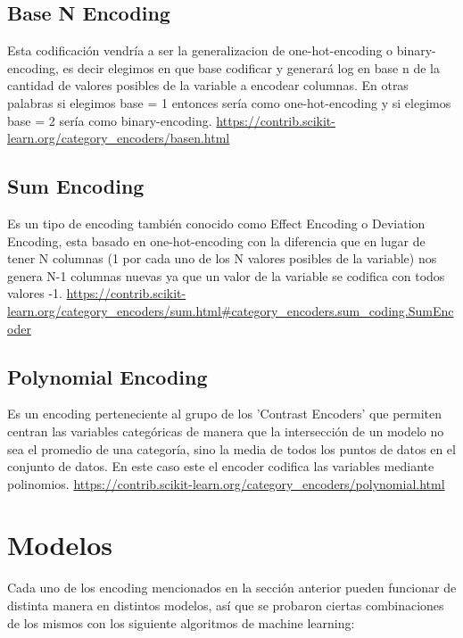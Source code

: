 \documentclass[12pt,a4paper]{article}
\begin{document}
\subsection{Base N Encoding}
Esta codificación vendría a ser la generalizacion de one-hot-encoding o binary-encoding, es decir elegimos en que base codificar y generará log en base n de la cantidad de valores posibles de la variable a encodear columnas. En otras palabras si elegimos base = 1 entonces sería como one-hot-encoding y si elegimos base = 2 sería como binary-encoding.
\url{https://contrib.scikit-learn.org/category_encoders/basen.html}

\subsection{Sum Encoding}
Es un tipo de encoding también conocido como Effect Encoding o Deviation Encoding, esta basado en one-hot-encoding con la diferencia que en lugar de tener N columnas (1 por cada uno de los N valores posibles de la variable) nos genera N-1 columnas nuevas ya que un valor de la variable se codifica con todos valores -1.
\url{https://contrib.scikit-learn.org/category_encoders/sum.html#category_encoders.sum_coding.SumEncoder}

\subsection{Polynomial Encoding}
Es un encoding perteneciente al grupo de los 'Contrast Encoders' que permiten centran las variables categóricas de manera que la intersección de un modelo no sea el promedio de una categoría, sino la media de todos los puntos de datos en el conjunto de datos.
En este caso este el encoder codifica las variables mediante polinomios. 
\url{https://contrib.scikit-learn.org/category_encoders/polynomial.html}
\newpage
\section{Modelos}
Cada uno de los encoding mencionados en la sección anterior pueden funcionar de distinta manera en distintos modelos, así que se probaron ciertas combinaciones de los mismos con los siguiente algoritmos de machine learning:
\end{document}
